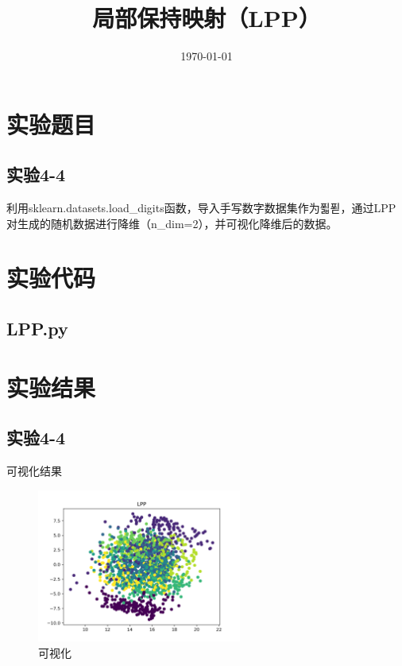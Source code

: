\documentclass{../source/Experiment}
\title{局部保持映射（LPP）}
\date{\today}
\begin{document}
    \makecover
    \section{实验题目}
        \subsection{实验4-4}
        利用sklearn.datasets.load\_digits函数，导入手写数字数据集作为푋푇，通过LPP对生成的随机数据进行降维（n\_dim=2），并可视化降维后的数据。

    \section{实验代码}
    \subsection{LPP.py}
    
   

    \section{实验结果}
        \subsection{实验4-4}
            可视化结果
            \begin{figure}[H]
                \centering
                \includegraphics[width = 0.6\textwidth]{Part4/4-4.png}
                \caption{可视化}
            \end{figure}
\end{document}
